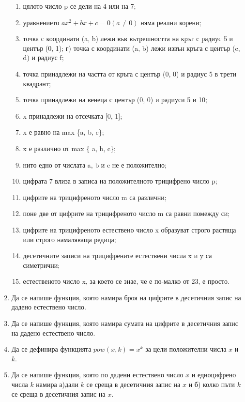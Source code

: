 \begin{enumerate}
	\begin{enumerate}[label=\alph*)]%
			 \item цялото число p се дели на 4 или на 7;
			 \item уравнението $ax^2 + bx + c = 0 (a \neq 0)$ няма реални корени;
			 \item точка с координати (a, b) лежи във вътрешността на кръг с радиус 5 и център (0, 1); г) точка с координати (a, b) лежи извън кръга с център (c, d) и радиус f;
			 \item точка принадлежи на частта от кръга с център (0, 0) и радиус 5 в трети квадрант;
			 \item точка принадлежи на венеца с център (0, 0) и радиуси 5 и 10;
			 \item x принадлежи на отсечката [0, 1];
			 \item x е равно на max \{a, b, c\};
			 \item x е различно от max \{ a, b, c\};
			 \item нито едно от числата a, b и c не е положително;
			 \item цифрата 7 влиза в записа на положителното трицифрено число p;
			 \item цифрите на трицифреното число m са различни;
			 \item поне две от цифрите на трицифреното число m са равни помежду си;
			 \item цифрите на трицифреното естествено число x образуват строго растяща или строго намаляваща редица;
			 \item десетичните записи на трицифрените естествени числа x и y са симетрични;
			 \item естественото число x, за което се знае, че е по-малко от 23, е просто.
  \end{enumerate}

  \item Да се напише функция, която намира броя на цифрите в десетичния запис на дадено естествено число.
  
  \item Да се напише функция, която намира сумата на цифрите в десетичния запис на дадено естествено число.
  
  \item Да се дефинира функцията $pow(x,k)=x^k$ за цели положителни числа $x$ и $k$.
  
  \item Да се напише функция, която по дадени естествено число $x$ и едноцифрено числа $k$ намира а)дали $k$ се среща в десетичния запис на $x$ и б) колко пъти $k$ се среща в десетичния запис на $x$.
  

\end{enumerate}
